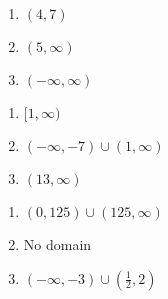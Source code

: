 \begin{multicols}{3}
\begin{enumerate}
\setcounter{enumi}{\value{HW}}


\item $(4, 7)$
\item $(5, \infty)$
\item $(-\infty, \infty)$

\setcounter{HW}{\value{enumi}}
\end{enumerate}
\end{multicols}


\begin{multicols}{3}
\begin{enumerate}
\setcounter{enumi}{\value{HW}}


\item $[1, \infty)$
\item $(-\infty, -7) \cup (1, \infty)$
\item $(13, \infty)$

\setcounter{HW}{\value{enumi}}
\end{enumerate}
\end{multicols}


\begin{multicols}{3}
\begin{enumerate}
\setcounter{enumi}{\value{HW}}


\item $(0, 125) \cup (125, \infty)$
\item No domain
\item $(-\infty, -3) \cup \left(\frac{1}{2}, 2\right)$

\setcounter{HW}{\value{enumi}}
\end{enumerate}
\end{multicols}

\pagebreak

